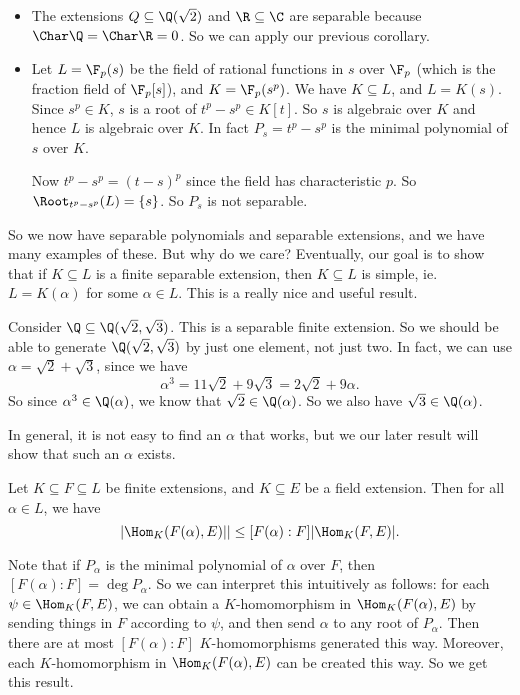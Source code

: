 \documentclass[a4paper]{article}
\begin{document}
\begin{eg}\leavevmode
  \begin{itemize}
    \item The extensions $Q \subseteq \Q(\sqrt{2})$ and $\R \subseteq \C$ are separable because $\Char \Q = \Char \R = 0$. So we can apply our previous corollary.
    \item Let $L = \F_p(s)$ be the field of rational functions in $s$ over $\F_p$ (which is the fraction field of $\F_p[s]$), and $K = \F_p(s^p)$. We have $K \subseteq L$, and $L = K(s)$. Since $s^p \in K$, $s$ is a root of $t^p - s^p \in K[t]$. So $s$ is algebraic over $K$ and hence $L$ is algebraic over $K$. In fact $P_s = t^p - s^p$ is the minimal polynomial of $s$ over $K$.

      Now $t^p - s^p = (t - s)^p$ since the field has characteristic $p$. So $\Root_{t^p - s^p}(L) = \{s\}$. So $P_s$ is not separable.
  \end{itemize}
\end{eg}
So we now have separable polynomials and separable extensions, and we have many examples of these. But why do we care? Eventually, our goal is to show that if $K\subseteq L$ is a finite separable extension, then $K \subseteq L$ is simple, ie. $L = K(\alpha)$ for some $\alpha \in L$. This is a really nice and useful result.

\begin{eg}
  Consider $\Q \subseteq \Q(\sqrt{2}, \sqrt{3})$. This is a separable finite extension. So we should be able to generate $\Q(\sqrt{2}, \sqrt{3})$ by just one element, not just two. In fact, we can use $\alpha = \sqrt{2} + \sqrt{3}$, since we have
  \[
    \alpha^3 = 11\sqrt{2} + 9\sqrt{3} = 2\sqrt{2} + 9 \alpha.
  \]
  So since $\alpha^3 \in \Q(\alpha)$, we know that $\sqrt{2} \in \Q(\alpha)$. So we also have $\sqrt{3} \in \Q(\alpha)$.
\end{eg}
In general, it is not easy to find an $\alpha$ that works, but we our later result will show that such an $\alpha$ exists.

\begin{lemma}
  Let $K\subseteq F\subseteq L$ be finite extensions, and $K\subseteq E$ be a field extension. Then for all $\alpha \in L$, we have
  \[
    |\Hom_K(F(\alpha), E)|| \leq [F(\alpha): F] |\Hom_K(F, E)|.
  \]
\end{lemma}
Note that if $P_\alpha$ is the minimal polynomial of $\alpha$ over $F$, then $[F(\alpha): F] = \deg P_\alpha$. So we can interpret this intuitively as follows: for each $\psi \in \Hom_K(F, E)$, we can obtain a $K$-homomorphism in $\Hom_K(F(\alpha), E)$ by sending things in $F$ according to $\psi$, and then send $\alpha$ to any root of $P_\alpha$. Then there are at most $[F(\alpha): F]$ $K$-homomorphisms generated this way. Moreover, each $K$-homomorphism in $\Hom_K(F(\alpha), E)$ can be created this way. So we get this result.
\end{document}

